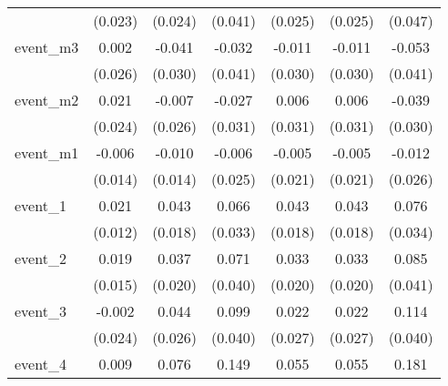 {\begin{tabular}{l*{6}{c}}
            &     (0.023)         &     (0.024)         &     (0.041)         &     (0.025)         &     (0.025)         &     (0.047)         \\
[1em]
event\_m3    &       0.002         &      -0.041         &      -0.032         &      -0.011         &      -0.011         &      -0.053         \\
            &     (0.026)         &     (0.030)         &     (0.041)         &     (0.030)         &     (0.030)         &     (0.041)         \\
[1em]
event\_m2    &       0.021         &      -0.007         &      -0.027         &       0.006         &       0.006         &      -0.039         \\
            &     (0.024)         &     (0.026)         &     (0.031)         &     (0.031)         &     (0.031)         &     (0.030)         \\
[1em]
event\_m1    &      -0.006         &      -0.010         &      -0.006         &      -0.005         &      -0.005         &      -0.012         \\
            &     (0.014)         &     (0.014)         &     (0.025)         &     (0.021)         &     (0.021)         &     (0.026)         \\
[1em]
event\_1     &       0.021         &       0.043\sym{*}  &       0.066\sym{*}  &       0.043\sym{*}  &       0.043\sym{*}  &       0.076\sym{*}  \\
            &     (0.012)         &     (0.018)         &     (0.033)         &     (0.018)         &     (0.018)         &     (0.034)         \\
[1em]
event\_2     &       0.019         &       0.037         &       0.071         &       0.033         &       0.033         &       0.085\sym{*}  \\
            &     (0.015)         &     (0.020)         &     (0.040)         &     (0.020)         &     (0.020)         &     (0.041)         \\
[1em]
event\_3     &      -0.002         &       0.044         &       0.099\sym{*}  &       0.022         &       0.022         &       0.114\sym{**} \\
            &     (0.024)         &     (0.026)         &     (0.040)         &     (0.027)         &     (0.027)         &     (0.040)         \\
[1em]
event\_4     &       0.009         &       0.076         &       0.149\sym{**} &       0.055\sym{*}  &       0.055\sym{*}  &       0.181\sym{***}\\

\end{tabular}}
